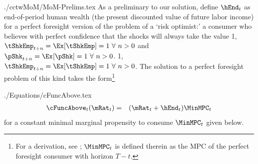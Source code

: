 \documentclass[titlepage]{\econtex}
\newcommand{\pShkOn}{\ifthenelse{\boolean{pShkVersion}}}
\begin{document}
\begin{verbatimwrite}{./cctwMoM/MoM-Prelims.tex}
  As a preliminary to our solution, define $\hEnd_{t}$ as
  end-of-period human wealth (the present discounted value
  of future labor income) for a perfect foresight version of the problem
  of a `risk optimist:' a consumer who believes with perfect confidence
  that the shocks will always take the value 
  \pShkOn
  {1, $\tShkEmp_{t+n} = \Ex[\tShkEmp]=1~\forall~n>0$ and $\pShk_{t+n} = \Ex[\pShk]=1~\forall~n>0$.}
  {1, $\tShkEmp_{t+n} = \Ex[\tShkEmp]=1~\forall~n>0$.}
  The solution to a perfect foresight problem of this kind takes the
  form\footnote{For a derivation, see \cite{BufferStockTheory}; $\MinMPC_{t}$ is defined therein as the MPC of the perfect foresight consumer with horizon $T-t$.}
\end{verbatimwrite}

\begin{verbatimwrite}{./Equations/cFuncAbove.tex}
  \begin{eqnarray}
    \cFuncAbove_{t}(\mRat_{t}) & = & (\mRat_{t} + \hEnd_{t})\MinMPC_{t} \label{eq:cFuncAbove}
  \end{eqnarray}
  for a constant minimal marginal propensity to consume $\MinMPC_{t}$ given below.
\end{verbatimwrite}

\end{document}

